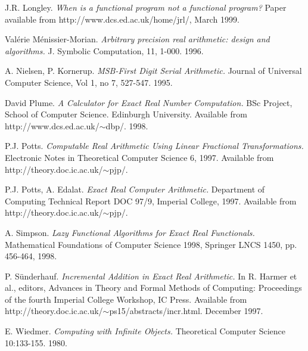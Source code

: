 \documentclass[12pt]{article}
\begin{document}
\begin{thebibliography}{20}
 J.R.  Longley. {\em When is a functional program
    not a functional program?}  Paper available from
  http://www.dcs.ed.ac.uk/home/jrl/, March 1999.
  
 Val\'erie M\'enissier-Morian. {\em
    Arbitrary precision real arithmetic: design and algorithms.} J.
  Symbolic Computation, 11, 1-000. 1996.
  
 A. Nielsen, P.  Kornerup.  {\em MSB-First Digit
    Serial Arithmetic.} Journal of Universal Computer Science, Vol 1,
  no 7, 527-547. 1995.
  
 David Plume. {\em A Calculator for Exact Real
    Number Computation.} BSc Project, School of Computer Science.
  Edinburgh University. Available from
  http://www.dcs.ed.ac.uk/$\sim$dbp/. 1998.
  
 P.J. Potts. {\em Computable Real Arithmetic Using
    Linear Fractional Transformations.}  Electronic Notes in
  Theoretical Computer Science 6, 1997.  Available from
  http://theory.doc.ic.ac.uk/$\sim$pjp/.
  
 P.J. Potts, A. Edalat. {\em Exact Real Computer
    Arithmetic.} Department of Computing Technical Report DOC 97/9,
  Imperial College, 1997. Available from
  http://theory.doc.ic.ac.uk/$\sim$pjp/.
  
 A. Simpson. {\em Lazy Functional Algorithms for
    Exact Real Functionals.} Mathematical Foundations of Computer
  Science 1998, Springer LNCS 1450, pp.  456-464, 1998.
  
 P. S\"{u}nderhauf. {\em Incremental Addition
    in Exact Real Arithmetic.} In R. Harmer et al., editors, Advances
  in Theory and Formal Methods of Computing: Proceedings of the fourth
  Imperial College Workshop, IC Press. Available from
  http://theory.doc.ic.ac.uk/$\sim$ps15/abstracts/incr.html.  December
  1997.
  
 E. Wiedmer.  {\em Computing with Infinite
    Objects.} Theoretical Computer Science 10:133-155.  1980.
  
\end{thebibliography}
\end{document}
